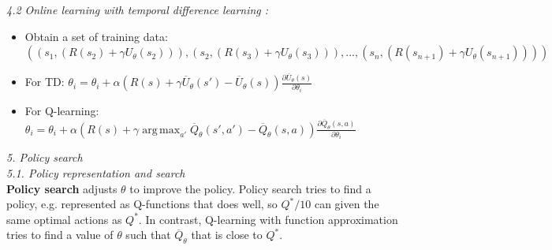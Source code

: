 \documentclass[12pt]{article}
\begin{document}
\noindent
\textsl{4.2 Online learning with temporal difference learning :}
\begin{itemize}
\item Obtain a set of training data: $((s_1, (R(s_2)+\gamma U_\theta (s_2))), (s_2, (R(s_3)+\gamma U_\theta (s_3))), ..., (s_n, (R(s_{n+1})+\gamma U_\theta (s_{n+1}))) )$
\item For TD:  $\theta_i = \theta_i + \alpha (R(s) +  \gamma \overline U_\theta(s') - \overline U_\theta(s)) \frac{\partial \overline U_\theta(s)}{\partial \theta_i}$

\item For Q-learning: $\theta_i = \theta_i + \alpha (R(s) +  \gamma  \operatorname*{arg\,max}_{a'} \overline Q_\theta(s', a') - \overline Q_\theta(s, a)) \frac{\partial \overline Q_\theta(s,a)}{\partial \theta_i}$
\end{itemize}

\noindent
\textsl{5. Policy search}\\

\noindent
\textsl{5.1. Policy representation and search}\\

\noindent
\textbf{Policy search} adjusts $\theta$ to improve the policy. Policy search tries to find a policy, e.g. represented as Q-functions that does well, so $Q^*/10$ can given the same optimal actions as $Q^*$. In contrast, Q-learning with function approximation tries to find a value of $\theta$ such that $\overline Q_\theta$ that is close to $Q^*$.\\
\end{document}
